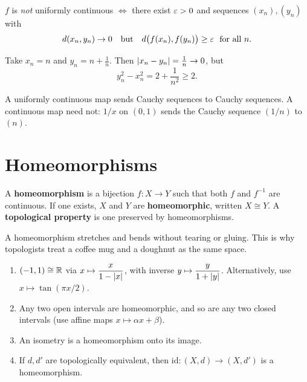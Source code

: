 \begin{proposition}\label{prop:ucseq}
$f$ is \emph{not} uniformly continuous $\iff$ there exist $\varepsilon>0$ and sequences $(x_n),(y_n)$ with
\[
  d(x_n,y_n)\to0\quad\text{but}\quad d\bigl(f(x_n),f(y_n)\bigr)\ge\varepsilon\ \text{ for all } n .
\]
\end{proposition}

\begin{example}
Take $x_n=n$ and $y_n=n+\frac1n$. Then $\left\lvert x_n-y_n\right\rvert=\frac1n\to0$, but
\[
  y_n^2-x_n^2=2+\frac1{n^2}\ge2 .
\]
\end{example}

\begin{proposition}
A uniformly continuous map sends Cauchy sequences to Cauchy sequences. A continuous map need not: $1/x$ on $(0,1)$ sends the Cauchy sequence $(1/n)$ to $(n)$.
\end{proposition}

\section{Homeomorphisms}
\begin{definition}\label{def:homeo}
A \textbf{homeomorphism} is a bijection $f\colon X\to Y$ such that both $f$ and $f^{-1}$ are continuous. If one exists, $X$ and $Y$ are \textbf{homeomorphic}, written $X\cong Y$. A \textbf{topological property} is one preserved by homeomorphisms.
\end{definition}

\begin{intuition}
A homeomorphism stretches and bends without tearing or gluing. This is why topologists treat a coffee mug and a doughnut as the same space.
\end{intuition}

\begin{example}\label{ex:homeos}
\leavevmode
\begin{enumerate}[label=(\alph*)]
  \item $(-1,1)\cong\mathbb{R}$ via $x\mapsto\dfrac{x}{1-\left\lvert x\right\rvert}$, with inverse $y\mapsto\dfrac{y}{1+\left\lvert y\right\rvert}$. Alternatively, use $x\mapsto\tan(\pi x/2)$.
  \item Any two open intervals are homeomorphic, and so are any two closed intervals (use affine maps $x\mapsto\alpha x+\beta$).
  \item An isometry is a homeomorphism onto its image.
  \item If $d,d'$ are topologically equivalent, then $\mathrm{id}\colon(X,d)\to(X,d')$ is a homeomorphism.
\end{enumerate}
\end{example}

